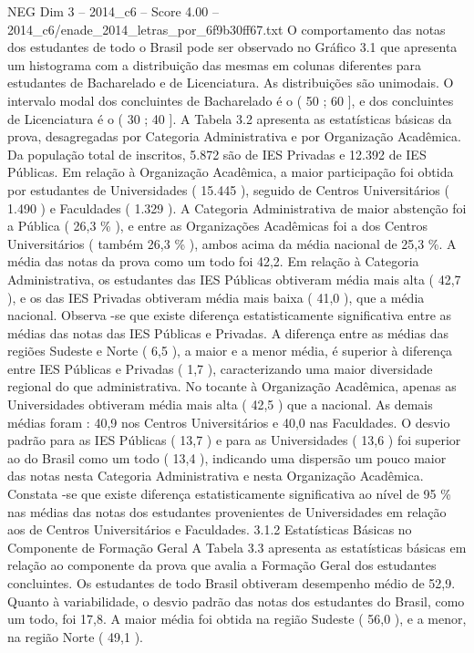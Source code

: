 \begin{textsample}{NEG Dim 3 – 2014\_c6 – Score 4.00 – 2014\_c6/enade\_2014\_letras\_por\_6f9b30ff67.txt}
O comportamento das notas dos estudantes de todo o Brasil pode ser observado no Gráfico 3.1 que apresenta um histograma com a distribuição das mesmas em colunas diferentes para estudantes de Bacharelado e de Licenciatura.
As distribuições são unimodais.
O intervalo modal dos concluintes de Bacharelado é o ( 50 ; 60 ], e dos concluintes de Licenciatura é o ( 30 ; 40 ].
A Tabela 3.2 apresenta as estatísticas básicas da prova, desagregadas por Categoria Administrativa e por Organização Acadêmica.
Da população total de inscritos, 5.872 são de IES Privadas e 12.392 de IES Públicas.
Em relação à Organização Acadêmica, a maior participação foi obtida por estudantes de Universidades ( 15.445 ), seguido de Centros Universitários ( 1.490 ) e Faculdades ( 1.329 ).
A Categoria Administrativa de maior abstenção foi a Pública ( 26,3 \% ), e entre as Organizações Acadêmicas foi a dos Centros Universitários ( também 26,3 \% ), ambos acima da média nacional de 25,3 \%.
A média das notas da prova como um todo foi 42,2.
Em relação à Categoria Administrativa, os estudantes das IES Públicas obtiveram média mais alta ( 42,7 ), e os das IES Privadas obtiveram média mais baixa ( 41,0 ), que a média nacional.
Observa -se que existe diferença estatisticamente significativa entre as médias das notas das IES Públicas e Privadas.
A diferença entre as médias das regiões Sudeste e Norte ( 6,5 ), a maior e a menor média, é superior à diferença entre IES Públicas e Privadas ( 1,7 ), caracterizando uma maior diversidade regional do que administrativa.
No tocante à Organização Acadêmica, apenas as Universidades obtiveram média mais alta ( 42,5 ) que a nacional.
As demais médias foram : 40,9 nos Centros Universitários e 40,0 nas Faculdades.
O desvio padrão para as IES Públicas ( 13,7 ) e para as Universidades ( 13,6 ) foi superior ao do Brasil como um todo ( 13,4 ), indicando uma dispersão um pouco maior das notas nesta Categoria Administrativa e nesta Organização Acadêmica.
Constata -se que existe diferença estatisticamente significativa ao nível de 95 \% nas médias das notas dos estudantes provenientes de Universidades em relação aos de Centros Universitários e Faculdades. 3.1.2 Estatísticas Básicas no Componente de Formação Geral A Tabela 3.3 apresenta as estatísticas básicas em relação ao componente da prova que avalia a Formação Geral dos estudantes concluintes.
Os estudantes de todo Brasil obtiveram desempenho médio de 52,9.
Quanto à variabilidade, o desvio padrão das notas dos estudantes do Brasil, como um todo, foi 17,8.
A maior média foi obtida na região Sudeste ( 56,0 ), e a menor, na região Norte ( 49,1 ).

\end{textsample}

